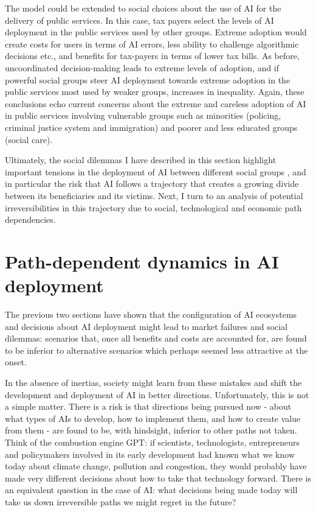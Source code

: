 \documentclass[11pt]{article}
\begin{document}
The model could be extended to social choices about the use of AI for the delivery of public services. In this case, tax payers select the levels of AI deployment in the public services used by other groups. Extreme adoption would create costs for users in terms of AI errors, less ability to challenge algorithmic decisions etc., and benefits for tax-payers in terms of lower tax bills. As before, uncoordinated decision-making leads to extreme levels of adoption, and if powerful social groups steer AI deployment towards extreme adoption in the public services most used by weaker groups, increases in inequality. Again, these conclusions echo current concerns about the extreme and careless adoption of AI in public services involving vulnerable groups such as minorities (policing, criminal justice system and immigration) and poorer and less educated groups (social care).

Ultimately, the social dilemmas I have described in this section highlight important tensions in the deployment of AI between different social groups , and in particular the risk that AI follows a trajectory that creates a growing divide between its beneficiaries and its victims. Next, I turn to an analysis of potential irreversibilities in this trajectory due to social, technological and economic path dependencies. 

\section{Path-dependent dynamics in AI deployment}
\label{sec:irreversible}
The previous two sections have shown that the configuration of AI ecosystems and decisions about AI deployment might lead to market failures and social dilemmas: scenarios that, once all benefits and costs are accounted for, are found to be inferior to alternative scenarios which perhaps seemed less attractive at the onset. 

In the absence of inertias, society might learn from these mistakes and shift the development and deployment of AI in better directions.  Unfortunately, this is not a simple matter. There is a risk is that directions being pursued now - about what types of AIs to develop, how to implement them, and how to create value from them - are found to be, with hindsight, inferior to other paths not taken. Think of the combustion engine GPT: if scientists, technologists, entrepreneurs and policymakers involved in its early development had known what we know today about climate change, pollution and congestion, they would probably have made very different decisions about how to take that technology forward. There is an equivalent question in the case of AI: what decisions being made today will take us down irreversible paths we might regret in the future?
\end{document}
